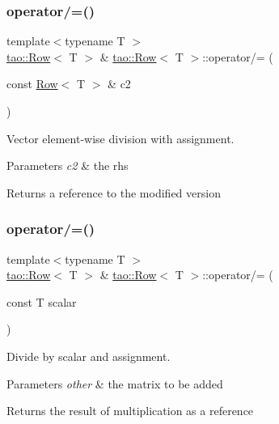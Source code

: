 \subsubsection{\texorpdfstring{operator/=()}{operator/=()}\hspace{0.1cm}{\footnotesize\ttfamily [1/2]}}
{\footnotesize\ttfamily template$<$typename T $>$ \\
\mbox{\hyperlink{classtao_1_1_row}{tao\+::\+Row}}$<$ T $>$ \& \mbox{\hyperlink{classtao_1_1_row}{tao\+::\+Row}}$<$ T $>$\+::operator/= (\begin{DoxyParamCaption}\item[{const \mbox{\hyperlink{classtao_1_1_row}{Row}}$<$ T $>$ \&}]{c2 }\end{DoxyParamCaption})}



Vector element-\/wise division with assignment. 


\begin{DoxyParams}{Parameters}
{\em c2} & the rhs \\
\hline
\end{DoxyParams}
\begin{DoxyReturn}{Returns}
a reference to the modified version 
\end{DoxyReturn}
\mbox{\label{classtao_1_1_row_a3af5bd67677890c474d495bf5578ff89}} 
\subsubsection{\texorpdfstring{operator/=()}{operator/=()}\hspace{0.1cm}{\footnotesize\ttfamily [2/2]}}
{\footnotesize\ttfamily template$<$typename T $>$ \\
\mbox{\hyperlink{classtao_1_1_row}{tao\+::\+Row}}$<$ T $>$ \& \mbox{\hyperlink{classtao_1_1_row}{tao\+::\+Row}}$<$ T $>$\+::operator/= (\begin{DoxyParamCaption}\item[{const T}]{scalar }\end{DoxyParamCaption})}



Divide by scalar and assignment. 


\begin{DoxyParams}{Parameters}
{\em other} & the matrix to be added \\
\hline
\end{DoxyParams}
\begin{DoxyReturn}{Returns}
the result of multiplication as a reference 
\end{DoxyReturn}
\mbox{\label{classtao_1_1_row_ae4516ba90753201b2941021dd398172a}} 

